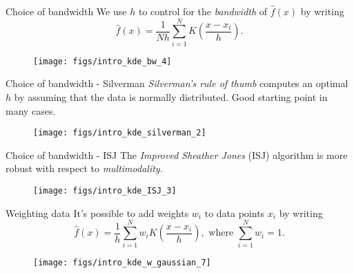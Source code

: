 \documentclass[11pt, aspectratio=149]{beamer}
\theoremstyle{plain}
\begin{document}
\begin{frame}[fragile, t]{Choice of bandwidth}
	We use $h$ to control for the \emph{bandwidth} of $\hat{f}(x)$ by writing
	\begin{equation*}
	\hat{f}(x) = \frac{1}{Nh} \sum_{i=1}^{N} K\left(\frac{x - x_i}{h}\right).
	\end{equation*}
	\vfill
	\begin{figure}
		\centering
		\texttt{[image: figs/intro\_kde\_bw\_4]}
	\end{figure}
\end{frame}


\begin{frame}[fragile, t]{Choice of bandwidth - Silverman}
	\emph{Silverman's rule of thumb} computes an optimal $h$ by assuming that the data is normally distributed. Good starting point in many cases.
	\vfill
	\begin{figure}
		\centering
		\texttt{[image: figs/intro\_kde\_silverman\_2]}
	\end{figure}
\end{frame}


\begin{frame}[fragile, t]{Choice of bandwidth - ISJ}
	The \emph{Improved Sheather Jones} (ISJ) algorithm is more robust with respect to \emph{multimodality}.
	\vfill
	\begin{figure}
		\centering
		\texttt{[image: figs/intro\_kde\_ISJ\_3]}
	\end{figure}
\end{frame}


\begin{frame}[fragile, t]{Weighting data}
	It's possible to add weights $w_i$ to data points $x_i$ by writing
	\begin{equation*}
	\hat{f}(x) = \frac{1}{h} \sum_{i=1}^{N} w_i K\left(\frac{x - x_i}{h}\right), \text{ where } \sum_{i=1}^{N} w_i = 1.
	\end{equation*}
	\vfill
	\begin{figure}
		\centering
		\texttt{[image: figs/intro\_kde\_w\_gaussian\_7]}
	\end{figure}
\end{frame}
\end{document}
